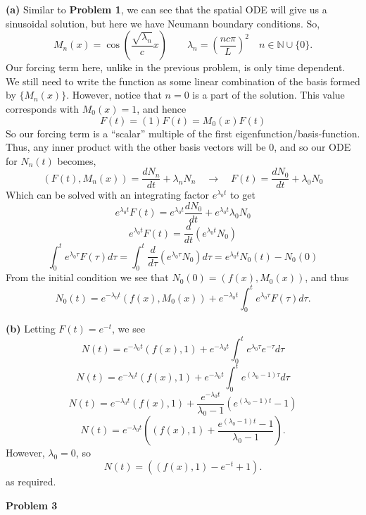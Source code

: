 \documentclass[10pt]{article}
\begin{document}
\textbf{(a)}
Similar to \textbf{Problem 1}, we can see that the spatial ODE will give us a sinusoidal solution, but here we have Neumann boundary conditions. So,
$$M_{n}(x) = \cos\left(\frac{\sqrt{\lambda_{n}}}{c}x\right) \hspace{2em} \lambda_{n} = \left(\frac{nc \pi}{L}\right)^{2} \hspace{1em} n\in \mathbb{N}\cup\{0\}.$$
Our forcing term here, unlike in the previous problem, is only time dependent. We still need to write the function as some linear combination of the basis formed by $\{M_{n}(x)\}$. However, notice that $n=0$ is a part of the solution. This value corresponds with $M_{0}(x) = 1$, and hence
$$F(t) = (1)F(t) = M_{0}(x)F(t)$$
So our forcing term is a ``scalar'' multiple of the first eigenfunction/basis-function. Thus, any inner product with the other basis vectors will be $0$, and so our ODE for $N_{n}(t)$ becomes,
$$(F(t),M_{n}(x)) = \frac{dN_{n}}{dt} + \lambda_{n}N_{n} \hspace{1em} \to \hspace{1em} F(t) = \frac{dN_{0}}{dt} + \lambda_{0}N_{0}$$
Which can be solved with an integrating factor $e^{\lambda_{0}t}$ to get
$$e^{\lambda_{0}t}F(t) = e^{\lambda_{0}t}\frac{dN_{0}}{dt} + e^{\lambda_{0}t}\lambda_{0}N_{0}$$
$$e^{\lambda_{0}t}F(t) = \frac{d}{dt}\left(e^{\lambda_{0}t}N_{0}\right)$$
$$\int_{0}^{t}e^{\lambda_{0}\tau}F(\tau)d\tau = \int_{0}^{t}\frac{d}{d\tau}\left(e^{\lambda_{0}\tau}N_{0}\right)d\tau = e^{\lambda_{0}t}N_{0}(t) - N_{0}(0)$$
From the initial condition we see that $N_{0}(0) = (f(x),M_{0}(x))$, and thus
$$N_{0}(t) = e^{-\lambda_{0}t}(f(x),M_{0}(x)) + e^{-\lambda_{0}t}\int_{0}^{t}e^{\lambda_{0}\tau}F(\tau)d\tau.$$

\textbf{(b)}
Letting $F(t) = e^{-t}$, we see
$$N(t) = e^{-\lambda_{0}t}(f(x),1) + e^{-\lambda_{0}t}\int_{0}^{t}e^{\lambda_{0}\tau}e^{-\tau}d\tau$$
$$N(t) = e^{-\lambda_{0}t}(f(x),1) + e^{-\lambda_{0}t}\int_{0}^{t}e^{(\lambda_{0} - 1)\tau}d\tau$$
$$N(t) = e^{-\lambda_{0}t}(f(x),1) + \frac{e^{-\lambda_{0}t}}{\lambda_{0}-1}\left(e^{(\lambda_{0} - 1)t} - 1\right)$$
$$N(t) = e^{-\lambda_{0}t}\left((f(x),1) + \frac{e^{(\lambda_{0} - 1)t} - 1}{\lambda_{0}-1}\right).$$
However, $\lambda_{0} = 0$, so
$$N(t) = \left((f(x),1) - e^{-t} + 1\right).$$
as required.

\newpage
\textbf{Problem 3}
\end{document}
